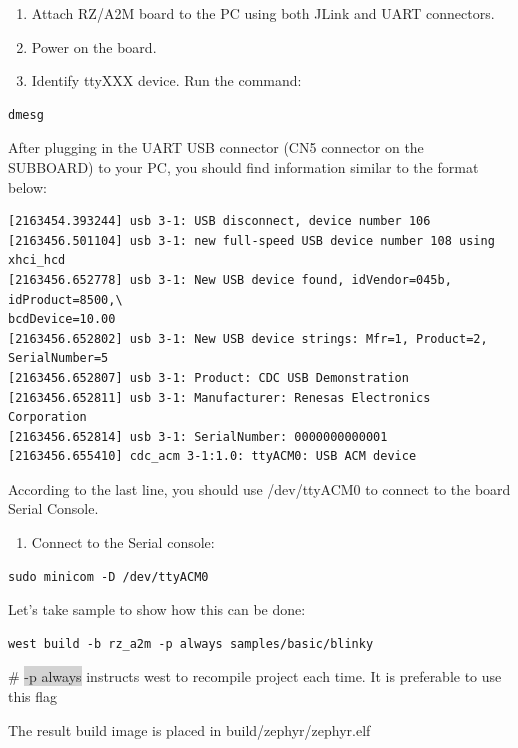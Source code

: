 \documentclass[11pt,a4paper,oneside]{article}
\begin{document}
\begin{enumerate}
\def\labelenumi{\arabic{enumi})}
\item
  Attach RZ/A2M board to the PC using both JLink and UART connectors.
\item
  Power on the board.
\item
  Identify ttyXXX device. Run the command:
\end{enumerate}

\begin{lstlisting}
dmesg
\end{lstlisting}

After plugging in the UART USB connector (CN5 connector on the SUBBOARD)
to your PC, you should find information similar to the format below:

\begin{lstlisting}
[2163454.393244] usb 3-1: USB disconnect, device number 106
[2163456.501104] usb 3-1: new full-speed USB device number 108 using xhci_hcd
[2163456.652778] usb 3-1: New USB device found, idVendor=045b, idProduct=8500,\
bcdDevice=10.00
[2163456.652802] usb 3-1: New USB device strings: Mfr=1, Product=2, SerialNumber=5
[2163456.652807] usb 3-1: Product: CDC USB Demonstration
[2163456.652811] usb 3-1: Manufacturer: Renesas Electronics Corporation
[2163456.652814] usb 3-1: SerialNumber: 0000000000001
[2163456.655410] cdc_acm 3-1:1.0: ttyACM0: USB ACM device
\end{lstlisting}

According to the last line, you should use /dev/ttyACM0 to connect to
the board Serial Console.

\begin{enumerate}
\def\labelenumi{\arabic{enumi})}
\setcounter{enumi}{3}
\item
  Connect to the Serial console:
\end{enumerate}

\begin{lstlisting}
sudo minicom -D /dev/ttyACM0
\end{lstlisting}

Let's take sample to show how this can be done:

\begin{lstlisting}
west build -b rz_a2m -p always samples/basic/blinky
\end{lstlisting}

\# \colorbox{lightgray}{-p always} instructs west to recompile project each time. It is
preferable to use this flag

The result build image is placed in build/zephyr/zephyr.elf
\end{document}
